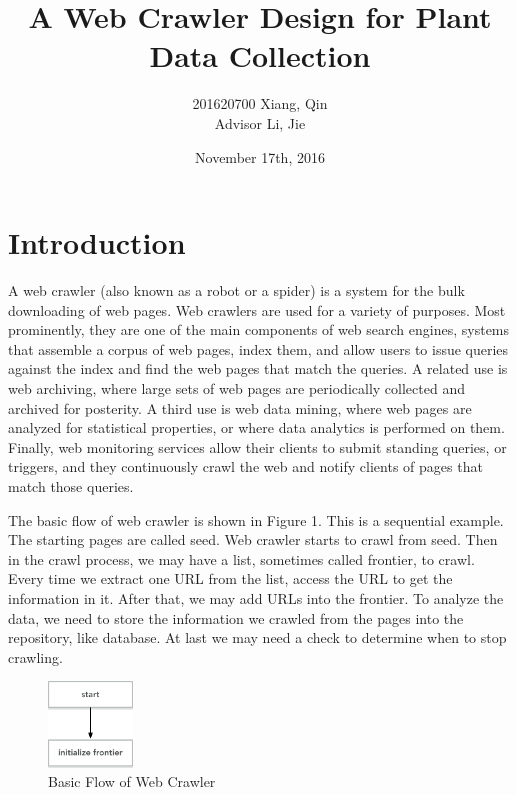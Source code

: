 \documentclass[twocolumn,10pt]{article}
\begin{document}
\date{November 17th, 2016}

\title{\bf A Web Crawler Design for Plant Data Collection}

\author{
	201620700 Xiang, Qin
	\\ Advisor Li, Jie
}

\maketitle

\section{Introduction}
A web crawler\cite{olston2010web} (also known as a robot or a spider) is a system for the bulk downloading of web pages. Web crawlers are used for a variety of purposes. Most prominently, they are one of the main components of web search engines, systems that assemble a corpus of web pages, index them, and allow users to issue queries against the index and find the web pages that match the queries. A related use is web archiving, where large  sets of web pages are periodically collected and archived for posterity. A third use is web data mining, where web pages are analyzed for statistical properties, or where data analytics is performed on them. Finally, web monitoring services allow their clients to submit standing queries, or triggers, and they continuously crawl the web and notify clients of pages that match those queries.\par
The basic flow of web crawler is shown in Figure 1. This is a sequential example. The starting pages are called seed. Web crawler starts to crawl from seed. Then in the crawl process, we may have a list, sometimes called frontier, to crawl. Every time we extract one URL from the list, access the URL to get the information in it. After that, we may add URLs into the frontier. To analyze the data, we need to store the information we crawled from the pages into the repository, like database.  At last we may need a check to determine when to stop crawling.\par
\begin{figure}
	\centering
	\includegraphics[width = 0.2\textwidth]{figure1}
	\caption{Basic Flow of Web Crawler}
\end{figure}
\end{document}
